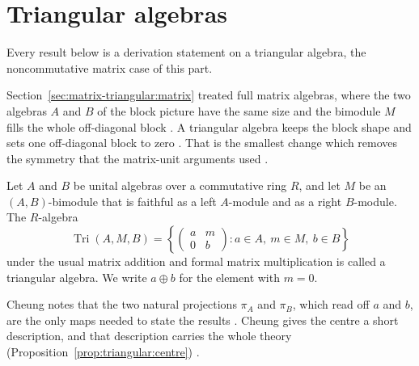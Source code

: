 \section{Triangular algebras}\label{sec:matrix-triangular:triangular}

Every result below is a derivation statement on a triangular algebra, the
noncommutative matrix case of this part. %

Section~\ref{sec:matrix-triangular:matrix} treated full matrix algebras, where
the two algebras $A$ and $B$ of the block picture have the same size and the
bimodule $M$ fills the whole off-diagonal block \cite[p.~119]{Cheung2001}. A
triangular algebra keeps the block shape and sets one off-diagonal block to
zero \cite[p.~119]{Cheung2001}. That is the smallest change which removes the
symmetry that the matrix-unit arguments used \cite[p.~119]{Cheung2001}.

\begin{definition}\label{def:triangular:algebra}
Let $A$ and $B$ be unital algebras over a commutative ring $R$, and let $M$ be an
$(A,B)$-bimodule that is faithful as a left $A$-module and as a right
$B$-module. The $R$-algebra
\[
\operatorname{Tri}(A,M,B)=\left\{\begin{pmatrix} a & m\\ 0 & b\end{pmatrix}:
a\in A,\ m\in M,\ b\in B\right\}
\]
under the usual matrix addition and formal matrix multiplication is called a
triangular algebra. We write $a\oplus b$ for the element with $m=0$.
\end{definition}

Cheung notes that the two natural projections $\pi_A$ and $\pi_B$, which read
off $a$ and $b$, are the only maps needed to state the results
\cite[Definition~3, p.~119]{Cheung2001}. Cheung gives the centre a short
description, and that description carries the whole theory
(Proposition~\ref{prop:triangular:centre}) \cite[p.~119]{Cheung2001}.

